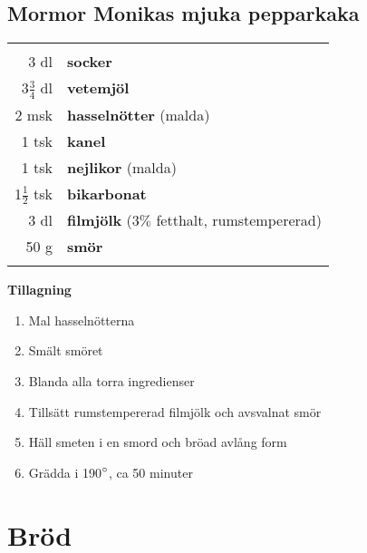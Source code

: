 \documentclass[a4paper,12pt]{article}
\begin{document}
\clearpage

\subsection{Mormor Monikas mjuka pepparkaka}

\begin{table}[H]
	\begin{tabular}{rl}
	\hline
	&\\
		3 dl & \textbf{socker}\\
		3$\frac{3}{4}$ dl & \textbf{vetemjöl}\\
		2 msk & \textbf{hasselnötter} (malda)\\
		1 tsk & \textbf{kanel}\\
		1 tsk & \textbf{nejlikor} (malda)\\
		1$\frac{1}{2}$ tsk & \textbf{bikarbonat}\\
		3 dl & \textbf{filmjölk} (3$\%$ fetthalt, rumstempererad)\\
		50 g & \textbf{smör}\\
	&\\
	\hline
	\end{tabular}
\end{table}

\begin{multicols*}{2}

\noindent \textbf{Tillagning}
\begin{enumerate}
	\itemsep0cm
	\item Mal hasselnötterna
	\item Smält smöret
	\item Blanda alla torra ingredienser
	\item Tillsätt rumstempererad filmjölk och avsvalnat smör
	\item Häll smeten i en smord och \mbox{bröad} avlång form
	\item Grädda i 190$\degree$, ca 50 minuter
\end{enumerate}

\end{multicols*}

\clearpage


\section{Bröd}
\end{document}

